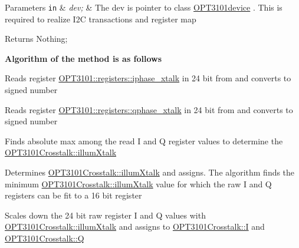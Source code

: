 \begin{DoxyParams}[1]{Parameters}
\mbox{\tt in}  & {\em dev;} & The dev is pointer to class \mbox{\hyperlink{class_o_p_t3101device}{O\+P\+T3101device}} . This is required to realize I2C transactions and register map \\
\hline
\end{DoxyParams}
\begin{DoxyReturn}{Returns}
Nothing; 
\end{DoxyReturn}
{\bfseries Algorithm of the method is as follows}


\begin{DoxyItemize}
\item Reads register \mbox{\hyperlink{class_o_p_t3101_1_1registers_ae87864da6c35bed7c34ebf5f26ba4513}{O\+P\+T3101\+::registers\+::iphase\+\_\+xtalk}} in 24 bit from and converts to signed number
\item Reads register \mbox{\hyperlink{class_o_p_t3101_1_1registers_ad94d98dfb26313a9d32c5c2c0c673693}{O\+P\+T3101\+::registers\+::qphase\+\_\+xtalk}} in 24 bit from and converts to signed number
\item Finds absolute max among the read I and Q register values to determine the \mbox{\hyperlink{class_o_p_t3101_crosstalk_ac34c766af7381d501b1716fd8a0076db}{O\+P\+T3101\+Crosstalk\+::illum\+Xtalk}}
\item Determines \mbox{\hyperlink{class_o_p_t3101_crosstalk_ac34c766af7381d501b1716fd8a0076db}{O\+P\+T3101\+Crosstalk\+::illum\+Xtalk}} and assigns. The algorithm finds the minimum \mbox{\hyperlink{class_o_p_t3101_crosstalk_ac34c766af7381d501b1716fd8a0076db}{O\+P\+T3101\+Crosstalk\+::illum\+Xtalk}} value for which the raw I and Q registers can be fit to a 16 bit register ~\newline

\item Scales down the 24 bit raw register I and Q values with \mbox{\hyperlink{class_o_p_t3101_crosstalk_ac34c766af7381d501b1716fd8a0076db}{O\+P\+T3101\+Crosstalk\+::illum\+Xtalk}} and assigns to \mbox{\hyperlink{class_o_p_t3101_crosstalk_a382c8271e35b33821b22d612466c96c7}{O\+P\+T3101\+Crosstalk\+::I}} and \mbox{\hyperlink{class_o_p_t3101_crosstalk_a0454e10774015dd2e941f9284ea516da}{O\+P\+T3101\+Crosstalk\+::Q}} 
\end{DoxyItemize}\mbox{\label{class_o_p_t3101_crosstalk_a4fa60e996e6b3a74387e7d20179ca899}} 
